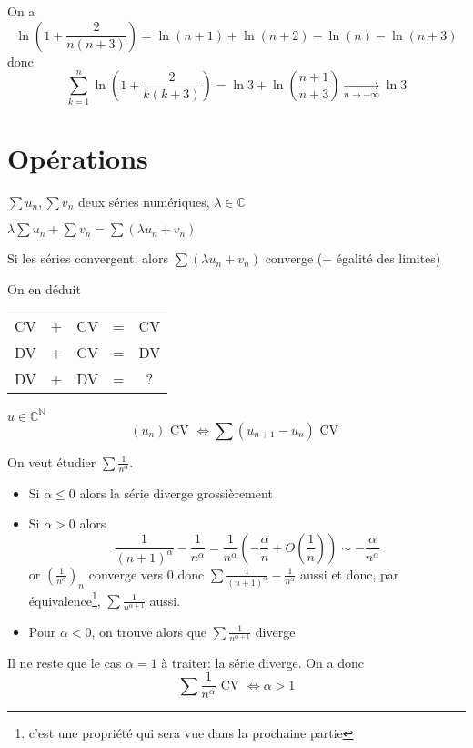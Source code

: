 \begin{ex}
    On a \[
        \ln \left( 1+\frac2{n(n+3)} \right)=\ln(n+1)+\ln(n+2)-\ln(n)-\ln(n+3)
    \]
    donc \[
        \sum_{k=1}^n\ln \left( 1+\frac2{k(k+3)} \right) =\ln3+\ln \left( \frac{n+1}{n+3} \right)\xrightarrow[n\to+\infty]{}\ln 3
    \]
\end{ex}

\section{Opérations}

\begin{prop}
    \Hyp $\sum u_n, \sum v_n$ deux séries numériques, $\lambda\in\mathbb C$
    \begin{concenum}
    \item $\lambda\sum u_n+\sum v_n=\sum(\lambda u_n+v_n)$
    \item Si les séries convergent, alors $\sum(\lambda u_n+v_n)$ converge (+ égalité des limites)
    \end{concenum}
\end{prop}

\begin{rem}
    On en déduit
    \begin{center}
    \begin{tabular}{ccccc}
        CV & + & CV & = & CV\\
        DV & + & CV & = & DV\\
        DV & + & DV & = & ?
    \end{tabular}
    \end{center}
\end{rem}

\begin{prop}
    \Hyp $u\in\mathbb C^{\mathbb N}$
    \Conc \[
        (u_n)\text{ CV }\iff \sum (u_{n+1}-u_n)\text{ CV }
    \]
\end{prop}

\begin{ex}
    On veut étudier $\sum\frac1{n^\alpha}$.
    \begin{itemize}
        \item Si $\alpha\leq0$ alors la série diverge grossièrement
        \item Si $\alpha> 0$ alors \[
                \frac1{(n+1)^\alpha}-\frac1{n^\alpha}=\frac1{n^\alpha} \left( -\frac\alpha n+O \left( \frac1n \right) \right)\sim -\frac\alpha{n^\alpha}
            \]
            or $(\frac1{n^{\alpha}})_n$ converge vers $0$ donc $\sum \frac1{(n+1)^\alpha}-\frac1{n^\alpha}$ aussi et donc, par équivalence\footnote{c'est une propriété qui sera vue dans la prochaine partie}, $\sum\frac1{n^{\alpha+1}}$ aussi.

        \item Pour $\alpha<0$, on trouve alors que $\sum\frac1{n^{\alpha+1}}$ diverge
    \end{itemize}
    Il ne reste que le cas $\alpha=1$ à traiter: la série diverge. On a donc \[
    \sum\frac1{n^\alpha}\text{ CV }\iff \alpha>1
\]
\end{ex}

